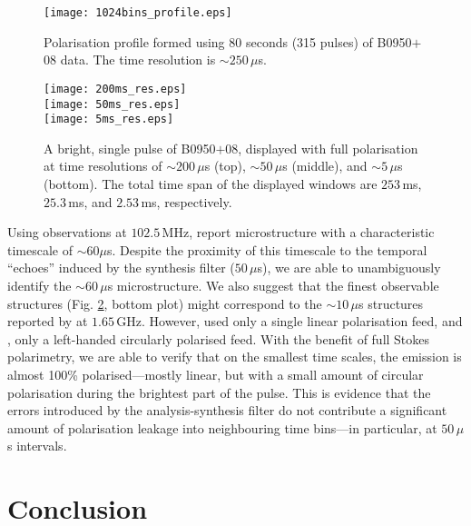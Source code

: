\documentclass{pasa}%
\newcommand{\psrslowB}{B0950$+$08}
\begin{document}
\begin{figure}[t!]
    \centering
    \texttt{[image: 1024bins\_profile.eps]}
    \caption{Polarisation profile formed using 80 seconds (315 pulses) of \psrslowB{} data. The time resolution is $\sim 250\,\mu$s.}
    \label{fig:0950_80_secs}
\end{figure}

\begin{figure}[t!]
    \centering
    \texttt{[image: 200ms\_res.eps]} \\[10pt]
    \texttt{[image: 50ms\_res.eps]} \\[10pt]
    \texttt{[image: 5ms\_res.eps]}
    \caption{A bright, single pulse of \psrslowB{}, displayed with full polarisation at time resolutions of $\sim 200\,\mu$s (top), $\sim 50\,\mu$s (middle), and $\sim 5\,\mu$s (bottom). The total time span of the displayed windows are $253\,$ms, $25.3\,$ms, and $2.53\,$ms, respectively.}
    \label{fig:0950_single_pulse}
\end{figure}

Using observations at $102.5\,$MHz, \citet{Kuzmin2003} report microstructure with a characteristic timescale of $\sim 60\mu$s.
Despite the proximity of this timescale to the temporal ``echoes'' induced by the synthesis filter ($50\,\mu$s), we are able to unambiguously identify the $\sim 60\,\mu$s microstructure.
We also suggest that the finest observable structures (Fig. \ref{fig:0950_single_pulse}, bottom plot) might correspond to the $\sim 10\,\mu$s structures reported by \citet{Popov2002} at $1.65\,$GHz.
However, \citet{Kuzmin2003} used only a single linear polarisation feed, and \citet{Popov2002}, only a left-handed circularly polarised feed.
With the benefit of full Stokes polarimetry, we are able to verify that on the smallest time scales, the emission is almost 100\% polarised---mostly linear, but with a small amount of circular polarisation during the brightest part of the pulse.
This is evidence that the errors introduced by the analysis-synthesis filter do not contribute a significant amount of polarisation leakage into neighbouring time bins---in particular, at $50\,\mu$s intervals.

\section{Conclusion}
\end{document}
